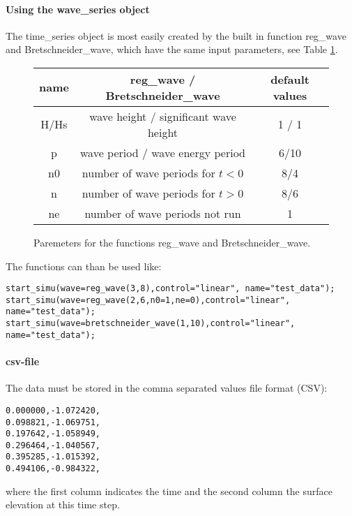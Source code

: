 \documentclass[oneside,10pt,a4paper]{book}
\begin{document}
\paragraph{Using the wave\_series object}
The time\_series object is most easily created by the built in function reg\_wave and Bretschneider\_wave, which have the same input parameters, see Table \ref{tab:params_waveseries}.
\begin{figure}\label{tab:params_waveseries}
	\centering
	\begin{tabular}{|c|c|c|}
		\hline
		name & reg\_wave / Bretschneider\_wave & default values\\
		\hline
		H/Hs &wave height / significant wave height& 1 / 1 \\
		\hline
		p&wave period / wave energy period&6/10\\
		\hline
		n0&number of wave periods for $t<0$&8/4\\
		\hline
		n&number of wave periods for $t>0$&8/6\\
		\hline
		ne&number of wave periods not run&1\\
		\hline
	\end{tabular}
	\caption{Paremeters for the functions reg\_wave and Bretschneider\_wave.}
\end{figure}
The functions can than be used like:
\begin{verbatim}
start_simu(wave=reg_wave(3,8),control="linear", name="test_data");
start_simu(wave=reg_wave(2,6,n0=1,ne=0),control="linear", name="test_data");
start_simu(wave=bretschneider_wave(1,10),control="linear", name="test_data");
\end{verbatim}
\paragraph{csv-file}
The data must be stored in the comma separated values file format (CSV):
\begin{verbatim}
0.000000,-1.072420,
0.098821,-1.069751,
0.197642,-1.058949,
0.296464,-1.040567,
0.395285,-1.015392,
0.494106,-0.984322,
\end{verbatim}
where the first column indicates the time and the second column the surface elevation at this time step.
\end{document}
